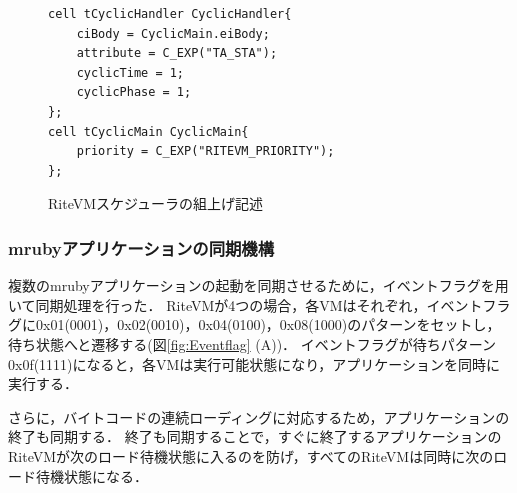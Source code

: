 \documentclass[submit,techrep]{ipsj}
\begin{document}
\begin{figure}[t]
    \centering
    \begin{lstlisting}
cell tCyclicHandler CyclicHandler{
    ciBody = CyclicMain.eiBody;
    attribute = C_EXP("TA_STA");
    cyclicTime = 1;
    cyclicPhase = 1;
};
cell tCyclicMain CyclicMain{
    priority = C_EXP("RITEVM_PRIORITY");
};
   \end{lstlisting}
    \vspace{-2mm}
    \caption{RiteVMスケジューラの組上げ記述}
\vspace{-3mm}
    \label{build_cyclic_handler}
\end{figure}
 
\subsubsection{mrubyアプリケーションの同期機構}
複数のmrubyアプリケーションの起動を同期させるために，イベントフラグを用いて同期処理を行った．
RiteVMが4つの場合，各VMはそれぞれ，イベントフラグに0x01(0001)，0x02(0010)，0x04(0100)，0x08(1000)のパターンをセットし，待ち状態へと遷移する(図\ref{fig:Eventflag} (A))．
イベントフラグが待ちパターン0x0f(1111)になると，各VMは実行可能状態になり，アプリケーションを同時に実行する．

さらに，バイトコードの連続ローディングに対応するため，アプリケーションの終了も同期する．
終了も同期することで，すぐに終了するアプリケーションのRiteVMが次のロード待機状態に入るのを防げ，すべてのRiteVMは同時に次のロード待機状態になる．
\end{document}
